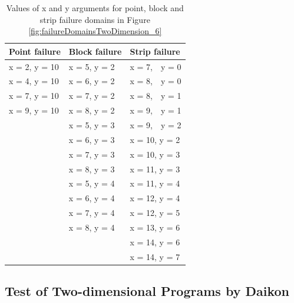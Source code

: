 \begin{table}[h]
\caption{Values of x and y arguments for point, block and strip failure domains in Figure \ref{fig:failureDomainsTwoDimension_6}}
\bigskip
\centering
{\renewcommand{\arraystretch}{1.3}
\begin{tabular}{|l|l|l|}
\hline
Point failure		& 	Block failure		& 	Strip failure		\\
\hline
x = 2, y = 10	&	x = 5, y = 2		&	x = 7,~~y = 0	\\	
x = 4, y = 10	&	x = 6, y = 2		&	x = 8,~~y = 0	\\	
x = 7, y = 10	&	x = 7, y = 2		&	x = 8,~~y = 1	\\
x = 9, y = 10	& 	x = 8, y = 2 		& 	x = 9,~~y = 1	\\
				& 	x = 5, y = 3 		& 	x = 9,~~y = 2	\\
				& 	x = 6, y = 3 		& 	x = 10, y = 2	\\
				& 	x = 7, y = 3 		& 	x = 10, y = 3	\\
				& 	x = 8, y = 3 		& 	x = 11, y = 3	\\
				& 	x = 5, y = 4 		& 	x = 11, y = 4	\\
				& 	x = 6, y = 4 		& 	x = 12, y = 4	\\
				& 	x = 7, y = 4 		& 	x = 12, y = 5	\\
				& 	x = 8, y = 4 		& 	x = 13, y = 6	\\
				&			      		& 	x = 14, y = 6	\\				
				&			      		& 	x = 14, y = 7	\\
\hline
\end{tabular}
}
\bigskip
\label{failureDomains_6}
\end{table}

\subsection{Test of Two-dimensional Programs by Daikon}\label{sec:intro6_12}













